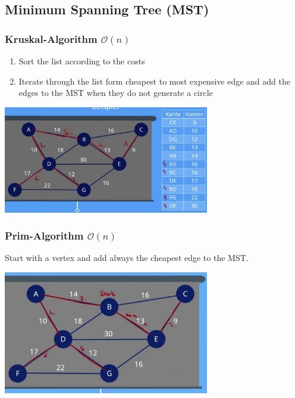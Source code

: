 \documentclass[10pt,a4paper,twocolumn]{article}
\begin{document}
\subsection{Minimum Spanning Tree (MST)}

\subsubsection{Kruskal-Algorithm $\mathcal{O}(n)$}

\begin{enumerate}
	\item Sort the list according to the costs
	\item Iterate through the list form cheapest to most expensive edge and add the edges to the MST when they do not generate a circle
\end{enumerate}


\begin{center}
	\includegraphics[width=9cm]{images/kruskal}
\end{center}

\subsubsection{Prim-Algorithm $\mathcal{O}(n)$}
Start with a vertex and add always the cheapest edge to the MST.

\begin{center}
\includegraphics[width=9cm]{images/prim}
\end{center}
\end{document}
